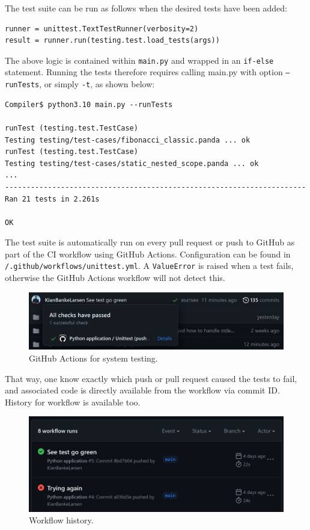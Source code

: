 The test suite can be run as follows when the desired tests have been added:

\begin{verbatim}
runner = unittest.TextTestRunner(verbosity=2)
result = runner.run(testing.test.load_tests(args))
\end{verbatim}

The above logic is contained within \texttt{main.py} and wrapped in an \texttt{if-else} statement. Running the tests therefore requires calling main.py with option \texttt{--runTests}, or simply \texttt{-t}, as shown below:

\begin{verbatim}
Compiler$ python3.10 main.py --runTests

runTest (testing.test.TestCase)
Testing testing/test-cases/fibonacci_classic.panda ... ok
runTest (testing.test.TestCase)
Testing testing/test-cases/static_nested_scope.panda ... ok
...
----------------------------------------------------------------------
Ran 21 tests in 2.261s

OK 
\end{verbatim}

The test suite is automatically run on every pull request or push to GitHub as part of the CI workflow using GitHub Actions. Configuration can be found in \texttt{/.github/workflows/unittest.yml}. A \texttt{ValueError} is raised when a test fails, otherwise the GitHub Actions workflow will not detect this.

\begin{figure}[H]
    \centering
    \includegraphics[width=1\textwidth]{misc/images/GitHub_Actions.png}
    \caption{GitHub Actions for system testing.}
\end{figure}

That way, one know exactly which push or pull request caused the tests to fail, and associated code is directly available from the workflow via commit ID. History for workflow is available too.

\begin{figure}[H]
    \centering
    \includegraphics[width=1\textwidth]{misc/images/Workflow.png}
    \caption{Workflow history.}
\end{figure}

